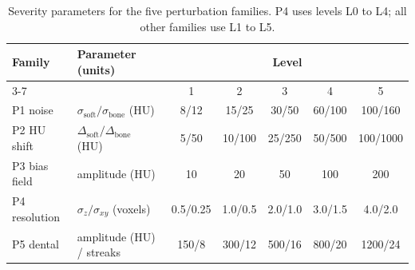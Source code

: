 \documentclass[11pt]{article}
\begin{document}
\begin{table}[t]
\centering
\caption{Severity parameters for the five perturbation families. P4 uses
levels L0 to L4; all other families use L1 to L5.}
\label{tab:severity}
\small
\begin{tabular}{llccccc}
\toprule
Family & Parameter (units) & \multicolumn{5}{c}{Level} \\
\cmidrule(lr){3-7}
 & & 1 & 2 & 3 & 4 & 5 \\
\midrule
P1 noise & $\sigma_\mathrm{soft}/\sigma_\mathrm{bone}$ (HU) & 8/12 & 15/25 & 30/50 & 60/100 & 100/160 \\
P2 HU shift & $\Delta_\mathrm{soft}/\Delta_\mathrm{bone}$ (HU) & 5/50 & 10/100 & 25/250 & 50/500 & 100/1000 \\
P3 bias field & amplitude (HU) & 10 & 20 & 50 & 100 & 200 \\
P4 resolution & $\sigma_z/\sigma_{xy}$ (voxels) & 0.5/0.25 & 1.0/0.5 & 2.0/1.0 & 3.0/1.5 & 4.0/2.0 \\
P5 dental & amplitude (HU) / streaks & 150/8 & 300/12 & 500/16 & 800/20 & 1200/24 \\
\bottomrule
\end{tabular}
\end{table}
\end{document}
